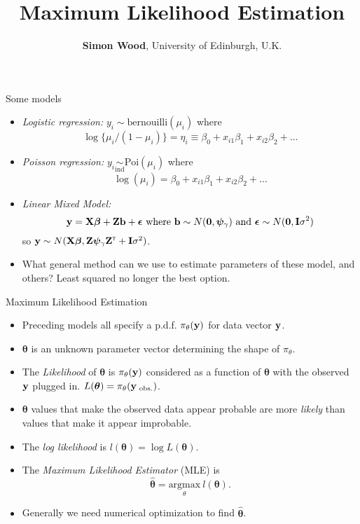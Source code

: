 \documentclass{beamer}
\title{Maximum Likelihood Estimation}
\author{{\bf Simon Wood}, University of Edinburgh, U.K.}
\date{}
\newcommand{\X}{{\bf X}}
\newcommand{\bp}{{\bm \beta}}
\newcommand{\ts}{^{\mbox{\sf \tiny T}}}
\begin{document}
\begin{frame}
\titlepage
\end{frame}

\begin{frame}{Some models}
\begin{itemize}
\item {\em Logistic regression:} $y_i \sim \text{bernouilli}(\mu_i)$ where 
$$
\log\{\mu_i/(1-\mu_i)\} = \eta_i \equiv \beta_0 + x_{i1}\beta_1 + x_{i2} \beta_2 + \ldots
$$
\item {\em Poisson regression:} $y_i \underset{\text{ind}}{\sim} \text{Poi}(\mu_i)$ where
$$
\log(\mu_i) = \beta_0 + x_{i1}\beta_1 + x_{i2} \beta_2 + \ldots
$$ 
\item {\em Linear Mixed Model:}
$$
{\bf y} = \X \bp + {\bf Zb} + {\bm \epsilon} \text{  where  } {\bf b} \sim N({\bf 0}, {\bm \psi}_{\gamma}) \text{  and  } {\bm \epsilon} \sim N({\bf 0}, {\bf I}\sigma^2)
$$
so ${\bf y} \sim N(\X \bp,{\bf Z}{\bm \psi}_{\gamma}{\bf Z}\ts + {\bf I} \sigma^2)$.
\item What general method can we use to estimate parameters of these model, and others? Least squared no longer the best option.
\end{itemize}
\end{frame}

\begin{frame}{Maximum Likelihood Estimation}
\begin{itemize}
\item Preceding models all specify a p.d.f. $\pi_\theta({\bf y})$ for data vector ${\bf y}$.
\item ${\bm \theta}$ is an unknown parameter vector determining the shape of $\pi_\theta$. 
\item The {\em Likelihood} of $\bm \theta$ is $\pi_\theta({\bf y})$ considered as a function of $\bm \theta$ with the observed $\bf y$ plugged in. $L({\bm \theta}) = \pi_\theta({\bf y}_{\text{ obs.}})$.
\item $\bm \theta $ values that make the observed data appear probable are more {\em likely} than values that make it appear improbable. 
\item The {\em log likelihood} is $l({\bm \theta}) = \log L({\bm \theta})$.
\item The {\em Maximum Likelihood Estimator} (MLE) is 
$$
\hat {\bm \theta} = \underset{\theta}{\text{argmax}} ~ l({\bm \theta}).
$$
\item Generally we need numerical optimization to find $\hat {\bm \theta}$.

\end{itemize}
\end{frame}
\end{document}
